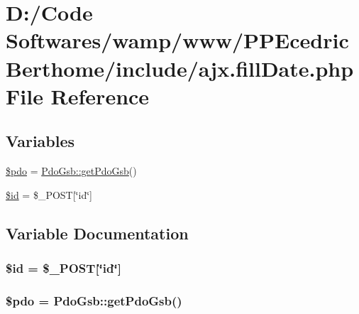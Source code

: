 \hypertarget{ajx_8fill_date_8php}{}\section{D\+:/\+Code Softwares/wamp/www/\+P\+P\+Ecedric\+Berthome/include/ajx.fill\+Date.\+php File Reference}
\label{ajx_8fill_date_8php}
\subsection*{Variables}
\begin{DoxyCompactItemize}
\item 
\hyperlink{ajx_8fill_date_8php_a5766efd703cef0e00bfc06b3f3acbe0e}{\$pdo} = \hyperlink{class_pdo_gsb_a37ab3ed998137aeaf4d581365520067e}{Pdo\+Gsb\+::get\+Pdo\+Gsb}()
\item 
\hyperlink{ajx_8fill_date_8php_ae97941710d863131c700f069b109991e}{\$id} = \$\+\_\+\+P\+O\+ST\mbox{[}\char`\"{}id\char`\"{}\mbox{]}
\end{DoxyCompactItemize}


\subsection{Variable Documentation}
\subsubsection[{\texorpdfstring{\$id}{$id}}]{\setlength{\rightskip}{0pt plus 5cm}\$id = \$\+\_\+\+P\+O\+ST\mbox{[}\char`\"{}id\char`\"{}\mbox{]}}\hypertarget{ajx_8fill_date_8php_ae97941710d863131c700f069b109991e}{}\label{ajx_8fill_date_8php_ae97941710d863131c700f069b109991e}
\subsubsection[{\texorpdfstring{\$pdo}{$pdo}}]{\setlength{\rightskip}{0pt plus 5cm}\$pdo = {\bf Pdo\+Gsb\+::get\+Pdo\+Gsb}()}\hypertarget{ajx_8fill_date_8php_a5766efd703cef0e00bfc06b3f3acbe0e}{}\label{ajx_8fill_date_8php_a5766efd703cef0e00bfc06b3f3acbe0e}
